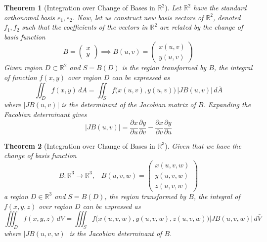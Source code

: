 \documentclass{article}
\newtheorem{theorem}{Theorem}[section]
\theoremstyle{remark}
\theoremstyle{definition}
\begin{document}
\begin{theorem}[Integration over Change of Bases in $\mathbb{R}^2$]
Let $\mathbb{R}^2$ have the standard orthonomal basis $e_1, e_2$. Now, let us construct new basis vectors of $\mathbb{R}^2$, denoted $f_1, f_2$ such that the coefficients of the vectors in $\mathbb{R}^2$ are related by the change of basis function 
\[B = \begin{pmatrix} x \\ y \end{pmatrix} \implies B(u, v) = \begin{pmatrix} x(u, v) \\ y(u, v) \end{pmatrix}\]
Given region $D \subset \mathbb{R}^2$ and $S = B(D)$ is the region transformed by $B$, the integral of function $f(x, y)$ over region $D$ can be expressed as 
\[\iint_D f(x, y) \, dA = \iint_S f \big( x(u, v), y(u, v) \big) \, \big| J B(u, v) \big| \, d \bar{A}\]
where $\big| J B(u, v) \big|$ is the determinant of the Jacobian matrix of $B$. Expanding the Facobian determinant gives
\[\big| J B(u, v) \big| = \frac{\partial x}{\partial u} \frac{\partial y}{\partial v} - \frac{\partial x}{\partial v} \frac{\partial y}{\partial u}\]
\end{theorem}

\begin{theorem}[Integration over Change of Bases in $\mathbb{R}^3$]
Given that we have the change of basis function 
\[B: \mathbb{R}^3 \longrightarrow \mathbb{R}^3, \;\;\; B(u, v, w) = \begin{pmatrix} x(u, v, w) \\ y(u, v, w) \\ z(u, v, w) \end{pmatrix}\]
a region $D \in \mathbb{R}^3$ and $S = B(D)$, the region transformed by $B$, the integral of $f(x, y, z)$ over region $D$ can be expressed as 
\[\iiint_D f(x, y, z)\, dV = \iiint_S f\big( x(u, v, w), y(u, v ,w), z(u, v, w) \big) \big| J B (u, v, w)\big| \, d \bar{V}\]
where $\big| J B (u, v, w)\big|$ is the Jacobian determinant of $B$. 
\end{theorem}
\end{document}
